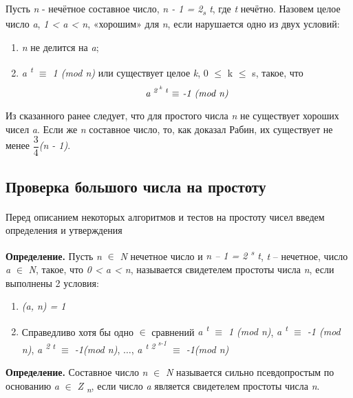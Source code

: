 Пусть \textit{n} - нечётное составное число, \textit{n - 1 = 2\textsubscript{s} t}, где \textit{t} нечётно. Назовем целое число \textit{a},
\textit{1 < a < n}, «хорошим» для \textit{n}, если нарушается одно из двух условий: 
\begin{enumerate}
 \item \textit{n} не делится на \textit{a};
 \item \textit{a\textsuperscript{ t} {$\equiv$} 1 (mod n)} или существует целое \textit{k}, 0 {$\leq$} k {$\leq$} s, такое, что
  \begin{equation}
      \textit{a\textsuperscript{ 2\textsuperscript{ k} t} {$\equiv$} -1 (mod n)}
  \end{equation}

\end{enumerate}
Из сказанного ранее следует, что для простого числа \textit{n} не существует хороших чисел \textit{a}. Если же \textit{n} составное число, 
то, как доказал Рабин, их существует не менее \textit{{$\dfrac{3}{4}$}(n - 1)}.


\subsection{Проверка большого числа на простоту}

\paragraph{} Перед описанием некоторых алгоритмов и тестов на простоту чисел введем определения и утверждения

  \textbf{Определение.} Пусть \textit{n} {$\in$} \textit{N} нечетное число и \textit{n – 1 = 2\textsuperscript{ s} t}, \textit{t} – нечетное,
число \textit{a} {$\in$} \textit{N}, такое, что \textit{0 < a < n}, называется свидетелем 
простоты числа \textit{n}, если выполнены 2 условия:

  \begin{enumerate}
    \item \textit{(a, n) = 1}
    \item Справедливо хотя бы одно {$\in$} сравнений \textit{a\textsuperscript{ t} {$\equiv$} 1 (mod n)}, 
\textit{a\textsuperscript{ t} {$\equiv$} -1 (mod n)}, \textit{a\textsuperscript{ 2 t} {$\equiv$} -1(mod n)},
{$\dots$}, \textit{a\textsuperscript{ t 2\textsuperscript{ s-1}} {$\equiv$} -1(mod n)}
  \end{enumerate}

  \textbf{Определение.} Составное число \textit{n} {$\in$} \textit{N} называется сильно псевдопростым по основанию \textit{a} 
{$\in$} \textit{Z\textsubscript{ n}}, если число \textit{a} является свидетелем простоты числа \textit{n}.

